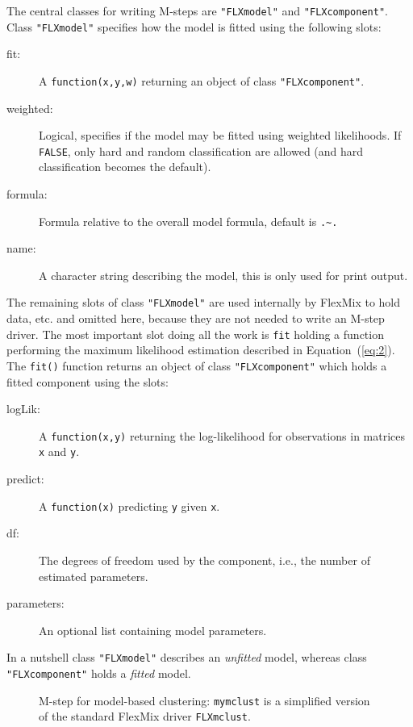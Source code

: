 \documentclass{jss}
\begin{document}
The central classes for writing M-steps are \texttt{"FLXmodel"} and
\texttt{"FLXcomponent"}. Class \texttt{"FLXmodel"} specifies how the
model is fitted using the following slots:
\begin{description}
 \item[fit:] A \texttt{function(x,y,w)} returning an object of class
  \texttt{"FLXcomponent"}.
 \item[weighted:] Logical, specifies if the model may be fitted using
  weighted likelihoods. If \texttt{FALSE}, only hard and random
  classification are allowed (and hard classification becomes the
  default). 
 \item[formula:] Formula relative to the overall model formula, default is
  \verb|.~.|
 \item[name:] A character string describing the model, this is only
  used for print output. 
\end{description}
The remaining slots of class \texttt{"FLXmodel"} are used internally
by FlexMix to hold data, etc. and omitted here, because they are not
needed to write an M-step driver. The most important slot doing all
the work is \texttt{fit} holding a function performing the maximum
likelihood estimation described in Equation~(\ref{eq:2}). The
\texttt{fit()} function returns an object of class \texttt{"FLXcomponent"}
which holds a fitted component using the slots:
\begin{description}
 \item[logLik:] A \texttt{function(x,y)} returning the
  log-likelihood for observations in matrices \texttt{x} and \texttt{y}.
 \item[predict:] A \texttt{function(x)} predicting \texttt{y} given
  \texttt{x}.
 \item[df:] The degrees of freedom used by the component, i.e., the
  number of estimated parameters.
 \item[parameters:] An optional list containing model parameters.
\end{description}
In a nutshell class \texttt{"FLXmodel"} describes an \emph{unfitted}
model, whereas class \texttt{"FLXcomponent"} holds a \emph{fitted}
model.

\lstset{frame=trbl,basicstyle=\small\tt,stepnumber=5,numbers=left}
                                                                               
\begin{figure}[tb]
  \centering
  \begin{minipage}{0.94\textwidth}
    
  \end{minipage}
  \caption{M-step for model-based clustering: \texttt{mymclust} is a
    simplified version of the standard FlexMix driver \texttt{FLXmclust}.}
  \label{fig:mymclust.R}
\end{figure}
\end{document}
